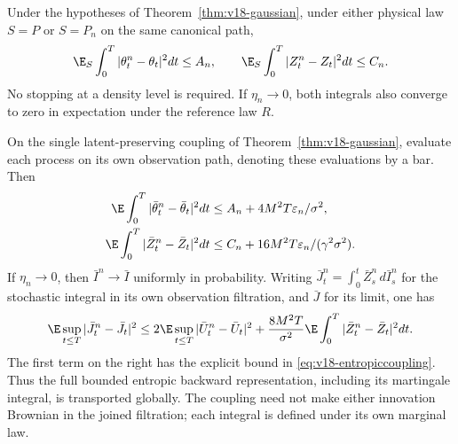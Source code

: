 \begin{theorem}
\label{thm:v19-global}
Under the hypotheses of Theorem~\ref{thm:v18-gaussian}, under either
physical law $S=P$ or $S=P_n$ on the same canonical path,
\begin{equation}\label{eq:v19-globalH2}
 \E_S\int_0^T|\theta_t^n-\theta_t|^2dt\le A_n,
 \qquad
 \E_S\int_0^T|Z_t^n-Z_t|^2dt\le C_n.
\end{equation}
No stopping at a density level is required. If $\eta_n\to0$, both
integrals also converge to zero in expectation under the reference law $R$.

On the single latent-preserving coupling of
Theorem~\ref{thm:v18-gaussian}, evaluate each process on its own observation
path, denoting these evaluations by a bar. Then
\begin{align}
 \E\int_0^T|\bar\theta_t^n-\bar\theta_t|^2dt
   &\le A_n+4M^2T\varepsilon_n/\sigma^2,
       \label{eq:v19-coupledtheta}\\
 \E\int_0^T|\bar Z_t^n-\bar Z_t|^2dt
   &\le C_n+16M^2T\varepsilon_n/(\gamma^2\sigma^2).
       \label{eq:v19-coupledZ}
\end{align}
If $\eta_n\to0$, then $\bar I^n\to\bar I$ uniformly in probability. Writing
$\bar J_t^n=\int_0^t\bar Z_s^n\,d\bar I_s^n$ for the stochastic
integral in its own observation filtration, and $\bar J$ for its limit,
one has
\begin{equation}\label{eq:v19-coupledJ}
 \E\sup_{t\le T}|\bar J_t^n-\bar J_t|^2
 \le 2\E\sup_{t\le T}|\bar U_t^n-\bar U_t|^2
       +\frac{8M^2T}{\sigma^2}
                     \E\int_0^T|\bar Z_t^n-\bar Z_t|^2dt.
\end{equation}
The first term on the right has the explicit bound in
\eqref{eq:v18-entropiccoupling}. Thus the full bounded entropic backward
representation, including its martingale integral, is transported globally.
The coupling need not make either innovation Brownian in the joined
filtration; each integral is defined under its own marginal law.
\end{theorem}

